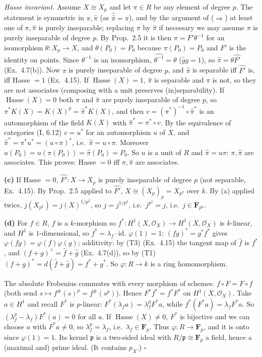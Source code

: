 \documentclass[11pt]{article}
\begin{document}
\emph{Hasse invariant.} Assume $X\cong X_p$ and let $\pi\in R$ be any element of degree $p$. The statement is symmetric in $\pi,\widehat\pi$ (as $\widehat{\widehat\pi}=\pi$), and by the argument of ($\Rightarrow$) at least one of $\pi,\widehat\pi$ is purely inseparable; replacing $\pi$ by $\widehat\pi$ if necessary we may assume $\pi$ is purely inseparable of degree $p$. By Prop.~2.5 it is then $\pi=F'\theta^{-1}$ for an isomorphism $\theta:X_p\to X$, and $\theta(P_0)=P_0$ because $\pi(P_0)=P_0$ and $F'$ is the identity on points. Since $\theta^{-1}$ is an isomorphism, $\widehat{\theta^{-1}}=\theta$ ($\widehat g g=1$), so $\widehat\pi=\theta\widehat{F'}$ (Ex.~4.7(b)). Now $\pi$ is purely inseparable of degree $p$, and $\widehat\pi$ is separable iff $\widehat{F'}$ is, iff Hasse $=1$ (Ex.~4.15). If $\operatorname{Hasse}(X)=1$, $\widehat\pi$ is separable and $\pi$ is not, so they are not associates (composing with a unit preserves (in)separability). If $\operatorname{Hasse}(X)=0$ both $\pi$ and $\widehat\pi$ are purely inseparable of degree $p$, so $\pi^*K(X)=K(X)^p=\widehat\pi^*K(X)$, and then $v=(\pi^*)^{-1}\circ\widehat\pi^*$ is an automorphism of the field $K(X)$ with $\widehat\pi^*=\pi^*\circ v$. By the equivalence of categories (I, 6.12) $v=u^*$ for an automorphism $u$ of $X$, and $\widehat\pi^*=\pi^*u^*=(u\circ\pi)^*$, i.e.\ $\widehat\pi=u\circ\pi$. Moreover $u(P_0)=u(\pi(P_0))=\widehat\pi(P_0)=P_0$. So $u$ is a unit of $R$ and $\widehat\pi=u\pi$: $\pi,\widehat\pi$ are associates. This proves: Hasse $=0$ iff $\pi,\widehat\pi$ are associates.

\textbf{(c)} If Hasse $=0$, $\widehat{F'}:X\to X_p$ is purely inseparable of degree $p$ (not separable, Ex.~4.15). By Prop.~2.5 applied to $\widehat{F'}$, $X\cong(X_p)_p=X_{p^2}$ over $k$. By (a) applied twice, $j(X_{p^2})=j(X)^{1/p^2}$, so $j=j^{1/p^2}$, i.e.\ $j^{p^2}=j$, i.e.\ $j\in\mathbf F_{p^2}$.

\textbf{(d)} For $f\in R$, $f$ is a $k$-morphism so $f^*:H^1(X,\mathcal O_X)\to H^1(X,\mathcal O_X)$ is $k$-linear, and $H^1$ is $1$-dimensional, so $f^*=\lambda_f\cdot\mathrm{id}$. $\varphi(1)=1$; $(fg)^*=g^*f^*$ gives $\varphi(fg)=\varphi(f)\varphi(g)$; additivity: by (T3) (Ex.~4.15) the tangent map of $\widehat f$ is $f^*$, and $(f+g)^\wedge=\widehat f+\widehat g$ (Ex.~4.7(d)), so by (T1) $(f+g)^*=d(\widehat f+\widehat g)=f^*+g^*$. So $\varphi:R\to k$ is a ring homomorphism.

The absolute Frobenius commutes with every morphism of schemes: $f\circ F=F\circ f$ (both send $s\mapsto f^\#(s)^p=f^\#(s^p)$). Hence $F^*f^*=f^*F^*$ on $H^1(X,\mathcal O_X)$. Take $a\in H^1$ and recall $F^*$ is $p$-linear: $F^*(\lambda_fa)=\lambda_f^pF^*a$, while $f^*(F^*a)=\lambda_fF^*a$. So $(\lambda_f^p-\lambda_f)F^*(a)=0$ for all $a$. If $\operatorname{Hasse}(X)\ne0$, $F^*$ is bijective and we can choose $a$ with $F^*a\neq0$, so $\lambda_f^p=\lambda_f$, i.e.\ $\lambda_f\in\mathbf F_p$. Thus $\varphi:R\to\mathbf F_p$, and it is onto since $\varphi(1)=1$. Its kernel $\mathfrak p$ is a two-sided ideal with $R/\mathfrak p\cong\mathbf F_p$ a field, hence a (maximal and) prime ideal. (It contains $p_X$.) \hfill$\square$
\end{document}
